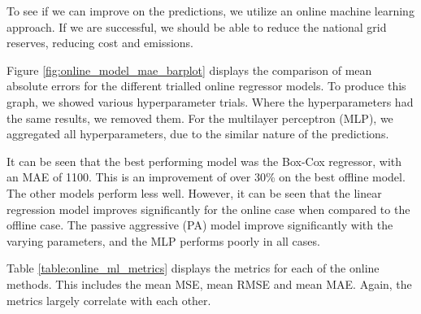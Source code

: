 \documentclass[final,3p,times,twocolumn,numbers]{elsarticle}
\begin{document}
To see if we can improve on the predictions, we utilize an online machine learning approach. If we are successful, we should be able to reduce the national grid reserves, reducing cost and emissions.


Figure \ref{fig:online_model_mae_barplot} displays the comparison of mean absolute errors for the different trialled online regressor models. To produce this graph, we showed various hyperparameter trials. Where the hyperparameters had the same results, we removed them. For the multilayer perceptron (MLP), we aggregated all hyperparameters, due to the similar nature of the predictions.

It can be seen that the best performing model was the Box-Cox regressor, with an MAE of 1100. This is an improvement of over 30\% on the best offline model. The other models perform less well. However, it can be seen that the linear regression model improves significantly for the online case when compared to the offline case. The passive aggressive (PA) model improve significantly with the varying parameters, and the MLP performs poorly in all cases.


Table \ref{table:online_ml_metrics} displays the metrics for each of the online methods. This includes the mean MSE, mean RMSE and mean MAE. Again, the metrics largely correlate with each other.

%		
\end{document}
